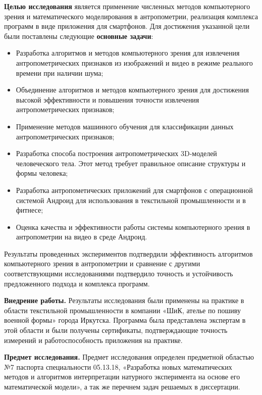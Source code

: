 \textbf{Целью исследования} является применение численных методов компьютерного зрения и математического моделирования в антропометрии, реализация комплекса программ в виде приложения для смартфонов. Для достижения указанной цели были поставлены следующие \textbf {основные задачи}:
\begin{itemize}
	\item Разработка алгоритмов и методов компьютерного зрения для извлечения антропометрических признаков из изображений и видео в режиме реального времени при наличии шума;
	\item Объединение алгоритмов и методов компьютерного зрения для достижения высокой эффективности и повышения точности извлечения антропометрических признаков;
	\item Применение методов машинного обучения для классификации данных антропометрических признаков;
	\item Разработка способа построения антропометрических 3D-моделей человеческого тела. Этот метод требует правильное описание структуры и формы человека;
	\item Разработка антропометических приложений для смартфонов с операционной системой Андроид для использования в текстильной промышленности и в фитнесе;
	\item Оценка качества и эффективности работы системы компьютерного зрения в антропометрии на видео в среде Андроид.
\end{itemize}
Результаты проведенных экспериментов подтвердили эффективность алгоритмов компьютерного зрения в антропометрии и сравнение с другими соответствующими исследованиями подтвердило точность и устойчивость предложенного подхода и комплекса программ.

\textbf{Внедрение работы.} Результаты исследования были применены на практике в области текстильной промышленности в компании «ШиК, ателье по пошиву военной формы» города Иркутска. Программа была представлена экспертам в этой области и были получены сертификаты, подтверждающие точность измерений и работоспособность приложения на практике.

\textbf{Предмет исследования.} Предмет исследования определен предметной областью №7 паспорта специальности 05.13.18, «Разработка новых математических методов и алгоритмов интерпретации натурного эксперимента на основе его математической модели», а так же перечнем задач решаемых в диссертации.

